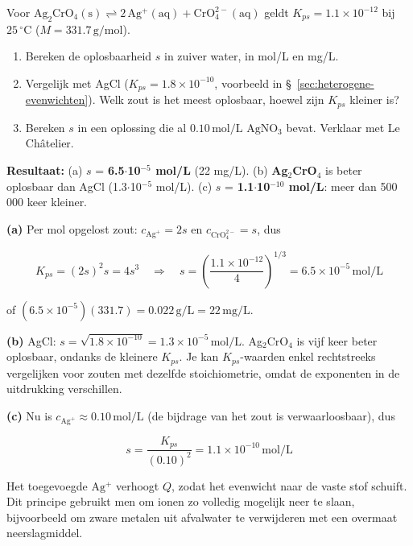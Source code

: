 \begin{oefening}
Voor \(\mathrm{Ag_2CrO_4(s) \rightleftharpoons 2\,Ag^+(aq) + CrO_4^{2-}(aq)}\) geldt \(K_{ps} = 1.1\times10^{-12}\) bij \(25\,^\circ\mathrm{C}\) (\(M = 331.7\,\mathrm{g/mol}\)).

\begin{enumerate}
\item[(a)]
  Bereken de oplosbaarheid \(s\) in zuiver water, in mol/L en mg/L.
\item[(b)]
  Vergelijk met AgCl (\(K_{ps} = 1.8\times10^{-10}\), voorbeeld in \S~\ref{sec:heterogene-evenwichten}). Welk zout is het meest oplosbaar, hoewel zijn \(K_{ps}\) kleiner is?
\item[(c)]
  Bereken \(s\) in een oplossing die al \(0.10\,\mathrm{mol/L}\) \(\mathrm{AgNO_3}\) bevat. Verklaar met Le Châtelier.
\end{enumerate}
\end{oefening}
\begin{oplossing}
\textbf{Resultaat:} (a) \(s\) = \textbf{6.5\ensuremath{\cdot{}}10\ensuremath{^{-5}} mol/L} (22 mg/L). (b) \textbf{Ag\ensuremath{_{2}}CrO\ensuremath{_{4}}} is beter oplosbaar dan AgCl (1.3\ensuremath{\cdot{}}10\ensuremath{^{-5}} mol/L). (c) \(s\) = \textbf{1.1\ensuremath{\cdot{}}10\ensuremath{^{-10}} mol/L}: meer dan 500 000 keer kleiner.

\textbf{(a)} Per mol opgelost zout: \(c_{\mathrm{Ag^+}} = 2s\) en \(c_{\mathrm{CrO_4^{2-}}} = s\), dus

\[
K_{ps} = (2s)^2 s = 4s^3 \quad\Rightarrow\quad s = \left(\frac{1.1\times10^{-12}}{4}\right)^{1/3} = 6.5\times10^{-5}\,\mathrm{mol/L}
\]

of \((6.5\times10^{-5})(331.7) = 0.022\,\mathrm{g/L} = 22\,\mathrm{mg/L}\).

\textbf{(b)} AgCl: \(s = \sqrt{1.8\times10^{-10}} = 1.3\times10^{-5}\,\mathrm{mol/L}\). Ag\ensuremath{_{2}}CrO\ensuremath{_{4}} is vijf keer beter oplosbaar, ondanks de kleinere \(K_{ps}\). Je kan \(K_{ps}\)-waarden enkel rechtstreeks vergelijken voor zouten met dezelfde stoichiometrie, omdat de exponenten in de uitdrukking verschillen.

\textbf{(c)} Nu is \(c_{\mathrm{Ag^+}} \approx 0.10\,\mathrm{mol/L}\) (de bijdrage van het zout is verwaarloosbaar), dus

\[
s = \frac{K_{ps}}{(0.10)^2} = 1.1\times10^{-10}\,\mathrm{mol/L}
\]

Het toegevoegde \(\mathrm{Ag^+}\) verhoogt \(Q\), zodat het evenwicht naar de vaste stof schuift. Dit principe gebruikt men om ionen zo volledig mogelijk neer te slaan, bijvoorbeeld om zware metalen uit afvalwater te verwijderen met een overmaat neerslagmiddel.
\end{oplossing}

